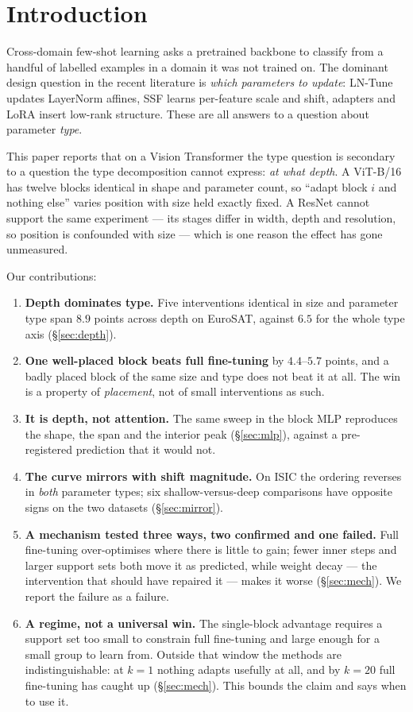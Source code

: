 \documentclass[11pt]{article}
\begin{document}
\section{Introduction}

Cross-domain few-shot learning asks a pretrained backbone to classify from a handful of
labelled examples in a domain it was not trained on. The dominant design question in the
recent literature is \emph{which parameters to update}: LN-Tune updates LayerNorm
affines, SSF learns per-feature scale and shift, adapters and LoRA insert low-rank
structure. These are all answers to a question about parameter \emph{type}.

This paper reports that on a Vision Transformer the type question is secondary to a
question the type decomposition cannot express: \emph{at what depth}. A ViT-B/16 has
twelve blocks identical in shape and parameter count, so ``adapt block $i$ and nothing
else'' varies position with size held exactly fixed. A ResNet cannot support the same
experiment --- its stages differ in width, depth and resolution, so position is
confounded with size --- which is one reason the effect has gone unmeasured.

Our contributions:
\begin{enumerate}
  \item \textbf{Depth dominates type.} Five interventions identical in size and
    parameter type span $8.9$ points across depth on EuroSAT, against $6.5$ for the
    whole type axis (\S\ref{sec:depth}).
  \item \textbf{One well-placed block beats full fine-tuning} by $4.4$--$5.7$ points,
    and a badly placed block of the same size and type does not beat it at all. The win
    is a property of \emph{placement}, not of small interventions as such.
  \item \textbf{It is depth, not attention.} The same sweep in the block MLP reproduces
    the shape, the span and the interior peak (\S\ref{sec:mlp}), against a
    pre-registered prediction that it would not.
  \item \textbf{The curve mirrors with shift magnitude.} On ISIC the ordering reverses
    in \emph{both} parameter types; six shallow-versus-deep comparisons have opposite
    signs on the two datasets (\S\ref{sec:mirror}).
  \item \textbf{A mechanism tested three ways, two confirmed and one failed.} Full
    fine-tuning over-optimises where there is little to gain; fewer inner steps and
    larger support sets both move it as predicted, while weight decay --- the
    intervention that should have repaired it --- makes it worse
    (\S\ref{sec:mech}). We report the failure as a failure.
  \item \textbf{A regime, not a universal win.} The single-block advantage requires a
    support set too small to constrain full fine-tuning and large enough for a small
    group to learn from. Outside that window the methods are indistinguishable: at
    $k=1$ nothing adapts usefully at all, and by $k=20$ full fine-tuning has caught up
    (\S\ref{sec:mech}). This bounds the claim and says when to use it.
\end{enumerate}
\end{document}
